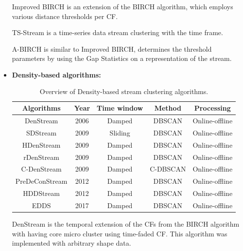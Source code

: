 \documentclass[../UNBThesis2.tex]{subfiles}
\begin{document}
\begin{itemize}
Improved BIRCH \cite{ismael2014improved} is an extension of the BIRCH algorithm, which employs various distance thresholds per CF.

TS-Stream \cite{pereira2014ts} is a time-series data stream clustering with the time frame. 

A-BIRCH \cite{lorbeer2016birch} is similar to Improved BIRCH, determines the threshold parameters by using the Gap Statistics on a representation of the stream.



\item\textbf{Density-based algorithms:}

\begin{table}[h]
    \centering
    \caption{Overview of Density-based stream clustering algorithms. }
    \label{densalgo}
    \small
    \begin{tabular}{c c c c c}
    \hline
      \textbf{Algorithms} & \textbf{Year} & \textbf{ Time window } & \textbf{Method} & \textbf{ Processing}  \\
     \hline \midrule

      DenStream          &    2006        &    Damped          &    DBSCAN      & Online-offline \\
     \hline
     SDStream            &    2009        &    Sliding         &    DBSCAN      & Online-offline \\
      \hline
      HDenStream         &     2009       &     Damped         &    DBSCAN      &  Online-offline \\
    \hline 
      rDenStream         &    2009        &    Damped         &     DBSCAN      & Online-offline \\
          \hline 
      C-DenStream        &    2009        &    Damped         &     C-DBSCAN    &Online-offline \\
          \hline 
      PreDeConStream     &    2012        &   Damped          &     DBSCAN      & Online-offline\\
          \hline 
      HDDStream          &    2012        &   Damped          &     DBSCAN      & Online-offline\\
          \hline 
      EDDS               &    2017        &   Damped          &     DBSCAN      & Online-offline\\
\bottomrule
    \end{tabular}
\end{table}

DenStream \cite{cao2006density} is the temporal extension of the CFs from the BIRCH algorithm with having core micro cluster using time-faded CF. This algorithm was implemented with arbitrary shape data.


\end{itemize}
\end{document}
